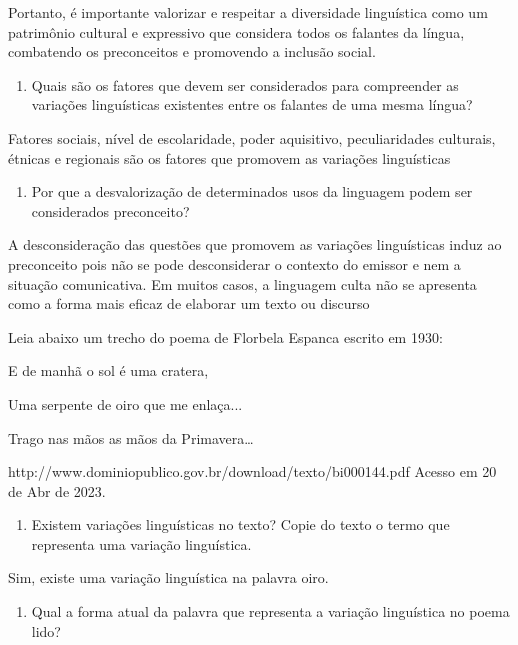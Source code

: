 {{\begin{itemize}
\begin{itemize}
{Portanto, é importante valorizar e respeitar a diversidade linguística
como um patrimônio cultural e expressivo que considera todos os falantes
da língua, combatendo os preconceitos e promovendo a inclusão social.}


\begin{enumerate}
\def\labelenumi{\arabic{enumi})}
\tightlist
\item
  Quais são os fatores que devem ser considerados para compreender as
  variações linguísticas existentes entre os falantes de uma mesma
  língua?
\end{enumerate}

Fatores sociais, nível de escolaridade, poder aquisitivo, peculiaridades
culturais, étnicas e regionais são os fatores que promovem as variações
linguísticas

\begin{enumerate}
\def\labelenumi{\arabic{enumi})}
\setcounter{enumi}{1}
\tightlist
\item
  Por que a desvalorização de determinados usos da linguagem podem ser
  considerados preconceito?
\end{enumerate}

A desconsideração das questões que promovem as variações linguísticas
induz ao preconceito pois não se pode desconsiderar o contexto do
emissor e nem a situação comunicativa. Em muitos casos, a linguagem
culta não se apresenta como a forma mais eficaz de elaborar um texto ou
discurso

Leia abaixo um trecho do poema de Florbela Espanca escrito em 1930:

E de manhã o sol é uma cratera,

Uma serpente de oiro que me enlaça...

Trago nas mãos as mãos da Primavera\ldots{}

http://www.dominiopublico.gov.br/download/texto/bi000144.pdf Acesso em
20 de Abr de 2023.

\begin{enumerate}
\def\labelenumi{\arabic{enumi})}
\setcounter{enumi}{2}
\tightlist
\item
  Existem variações linguísticas no texto? Copie do texto o termo que
  representa uma variação linguística.
\end{enumerate}

Sim, existe uma variação linguística na palavra oiro.

\begin{enumerate}
\def\labelenumi{\arabic{enumi})}
\setcounter{enumi}{3}
\tightlist
\item
  Qual a forma atual da palavra que representa a variação linguística no
  poema lido?
\end{enumerate}


\end{itemize}
\end{itemize}}}
